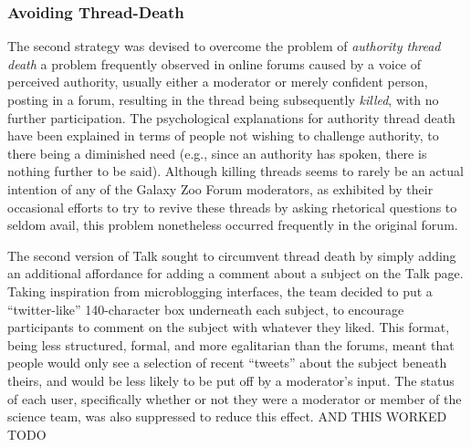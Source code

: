 \documentclass{sigchi}
\begin{document}

\subsubsection{Avoiding Thread-Death}

The second strategy was devised to overcome the problem of \emph{authority thread death} \cite{} a problem frequently observed in online forums caused by a voice of perceived authority, usually either a moderator or merely confident person, posting in a forum, resulting in the thread being subsequently \emph{killed}, with no further participation.  The psychological explanations for authority thread death have been explained in terms of people not wishing to challenge authority, to there being a diminished need (e.g., since an authority has spoken, there is nothing further to be said).  Although killing threads seems to rarely be an actual intention of any of the Galaxy Zoo Forum moderators, as exhibited by their occasional efforts to try to revive these threads by asking rhetorical questions to seldom avail, this problem nonetheless occurred frequently in the original forum.

The second version of Talk sought to circumvent thread death by simply adding an additional affordance for adding a comment about a subject on the Talk page.  Taking inspiration from microblogging interfaces, the team decided to put a ``twitter-like'' 140-character box underneath each subject, to encourage participants to comment on the subject with whatever they liked.  This format, being less structured, formal, and more egalitarian than the forums, meant that people would only see a selection of recent ``tweets'' about the subject beneath theirs, and would be less likely to be put off by a moderator's input.  The status of each user, specifically whether or not they were a moderator or member of the science team, was also suppressed to reduce this effect.    AND THIS WORKED TODO 
\end{document}
